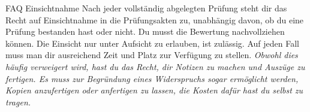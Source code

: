 \begin{artikel}{FAQ Einsichtnahme}
Nach jeder vollständig abgelegten Prüfung steht dir das Recht auf Einsichtnahme in die Prüfungsakten zu, unabhängig davon, ob du eine Prüfung bestanden hast oder nicht. Du musst die Bewertung nachvollziehen können. Die Einsicht nur unter Aufsicht zu erlauben, ist zulässig. Auf jeden Fall muss man dir ausreichend Zeit und Platz zur Verfügung zu stellen. \textit{Obwohl dies häufig verweigert wird, hast du das Recht, dir Notizen zu machen und Auszüge zu fertigen. Es muss zur Begründung eines Widerspruchs sogar ermöglicht werden, Kopien anzufertigen oder anfertigen zu lassen, die Kosten dafür hast du selbst zu tragen.}
\end{artikel}
